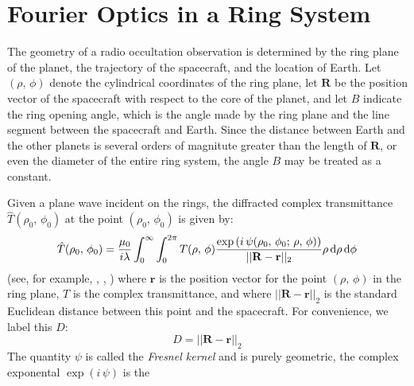 \documentclass{article}
\theoremstyle{plain}
\begin{document}
    \section{Fourier Optics in a Ring System}
        The geometry of a radio occultation observation is determined by the
        ring plane of the planet, the trajectory of the spacecraft, and the
        location of Earth. Let $(\rho,\,\phi)$ denote the cylindrical
        coordinates of the ring plane, let $\mathbf{R}$ be the position
        vector of the spacecraft with respect to the core of the planet, and
        let $B$ indicate the ring opening angle, which is the angle made
        by the ring plane and the line segment between the spacecraft and
        Earth. Since the distance between Earth and the other planets is
        several orders of magnitute greater than the length of $\mathbf{R}$,
        or even the diameter of the entire ring system, the angle $B$ may be
        treated as a constant.
        \par\hfill\par
        Given a plane wave incident on the rings, the diffracted complex
        transmittance $\hat{T}(\rho_{0},\,\phi_{0})$ at the point
        $(\rho_{0},\,\phi_{0})$ is given by:
        \begin{equation}
            \label{eqn:huygens_principal}
            \hat{T}(\rho_{0},\,\phi_{0})
            =\frac{\mu_{0}}{i\lambda}\int_{0}^{\infty}\int_{0}^{2\pi}
                T(\rho,\,\phi)
                \frac{%
                    \exp\left(
                        i\,\psi(\rho_{0},\,\phi_{0};\,\rho,\,\phi)
                    \right)
                }{%
                    ||\mathbf{R}-\mathbf{r}||_{2}
                }
                \rho\,\textrm{d}\rho\,\textrm{d}\phi
        \end{equation}
        (see, for example, \cite[Ch.~8]{BornAndWolfOptics},
        \cite[Ch.~3 and 4]{Goodman1969IntroductionTF},
        \cite[Eqn.~1]{MTR86})
        where $\mathbf{r}$ is the position vector for the point
        $(\rho,\,\phi)$ in the ring plane, $T$ is the complex transmittance,
        and where $||\mathbf{R}-\mathbf{r}||_{2}$ is the standard
        Euclidean distance between this point and the spacecraft.
        For convenience, we label this $D$:
        \begin{equation}
            D=||\mathbf{R}-\mathbf{r}||_{2}
        \end{equation}
        The quantity $\psi$ is called the \textit{Fresnel kernel} and is purely
        geometric, the complex exponental $\exp(i\,\psi)$ is the
\end{document}
